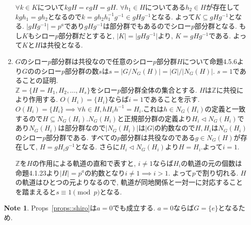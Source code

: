 \documentclass[dvipdfmx]{jsarticle}
\theoremstyle{definition}
\newtheorem{note}{Note}
\numberwithin{equation}{section}
\numberwithin{props}{section}
\numberwithin{definition}{section}
\numberwithin{note}{section}
\newcommand{\ZZ}{\mathbb{Z}}
\begin{document}
\begin{enumerate}
     $\forall k\in K$について$kgH=egH=gH$. $\forall h_1\in H$についてある$h_2\in H$が存在して$kgh_1=gh_2$となるので$k= gh_2h^{-1}_1g^{-1}\in gHg^{-1}$となる. よって$K\subseteq gHg^{-1}$となる. $\lvert gHg^{-1}\rvert=p^a$であり$gHg^{-1}$は部分群でもあるのでシロー$p$部分群となる. もし$K$もシロー$p$部分群だとすると, $\lvert K\rvert=\lvert gHg^{-1}\rvert$より, $K=gHg^{-1}$である. よって$K$と$H$は共役となる.
     \item $G$のシロー$p$部分群は共役なので任意のシロー$p$部分群$H$について命題4.5.6より$G$ののシロー$p$部分群の数$s$は$s=\lvert G/N_G(H)\rvert=\lvert G\rvert/\lvert N_G(H)\rvert$.
     $s=1$であることの証明.\\
     $\ZZ=\lbrace H=H_1,H_2,\ldots,H_s\rbrace$をシロー$p$部分群全体の集合とする.
$H$は$\ZZ$に共役により作用する. $O(H_i)=\lbrace H_i\rbrace$ならば$i=1$であることを示す.$O(H_i)=\lbrace H_i\rbrace\implies \forall h\in H, hH_ih^{-1}=H_i$.これは$h\in N_G(H_i)$の定義と一致するので$H\subseteq N_G(H_i)$.$N_G(H_i)$と正規部分群の定義より$H_i\lhd N_G(H_i)$であり$N_G(H_i)$は部分群なので$\lvert N_G(H_i)\rvert$は$\lvert G\rvert$の約数なので$H,H_i$は$N_G(H_i)$のシロー$p$部分群である. すべての$p$部分群は共役なのである$g\in N_G(H)$が存在して, $H=gH_ig^{-1}$となる. さらに$H_i\lhd N_G(H_i)$より$H=H_i$.よって$i=1$.
 
 $\ZZ$を$H$の作用による軌道の直和で表すと, $i\neq 1$ならば$H_i$の軌道の元の個数は命題4.1.23より$\lvert H\rvert=p^a$の約数となり$i\neq 1 \implies i>1$. よって$p$で割り切れる. $H$の軌道はひとつの元よりなるので, 軌道が同地関係と一対一に対応することを踏まえると$s\equiv 1 \pmod p$となる.
\end{enumerate}
\begin{note}
     Props~\ref{props::shiro}は$a=0$でも成立する. $a=0$ならば$G=\lbrace e\rbrace$となるため.
\end{note}
\end{document}

